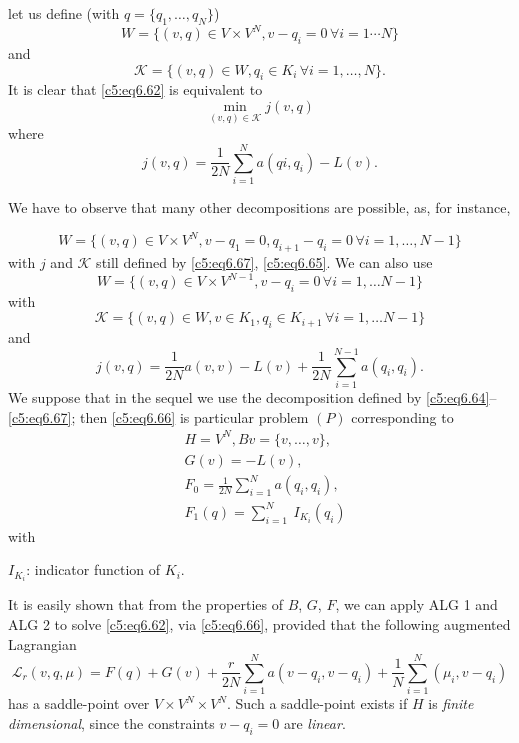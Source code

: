 let us define (with $q = \{ q_1, \ldots, q_N \}$)
\begin{equation}
W = \{ (v, q) \in V \times V^N,  v-q_i = 0\, \forall i = 1\cdots N 
\} \tag{6.64}\label{c5:eq6.64} 
\end{equation}
and 
\begin{equation}
\mathscr{K} = \{ (v, q) \in W,  q_i \in K_i\, \forall i = 1,  
\ldots, N \}. \tag{6.65}\label{c5:eq6.65} 
\end{equation}
It is clear that \eqref{c5:eq6.62} is equivalent to 
\begin{equation}
\min_{(v, q) \in \mathscr{K}} j (v, q) \tag{6.66}\label{c5:eq6.66}
\end{equation}
where 
\begin{equation}
j(v, q) = \frac{1}{2N} \sum^N_{i=1} a (qi, q_i) - L(v). 
\tag{6.67}\label{c5:eq6.67} 
\end{equation}

\begin{remark}\label{c5:rem6.8}%
We have to observe that many other decompositions are possible, as,
for instance,  
\end{remark}
$$
W = \{ (v, q) \in V \times V^N, v-q_1 =0,  q_{i+1}-q_i = 0\, \forall 
i = 1, \ldots, N - 1 \} 
$$
with $j$ and $\mathscr{K}$ still defined by \eqref{c5:eq6.67}, 
\eqref{c5:eq6.65}. We can also use  
$$
W = \{ (v, q) \in V \times V^{N-1},  v-q_i = 0\, \forall i = 1,  
\ldots N-1 \} 
$$
with 
$$
\mathscr{K}= \{ (v, q) \in W,  v \in K_1, q_i \in K_{i + 
1}\, \forall i = 1,  \ldots N-1 \} 
$$
and 
$$
j(v, q) = \frac{1}{2N} a(v, v) - L (v) + \frac{1}{2N} \sum^{N-1}_{i=1} 
a (q_i, q_i).  
$$\pageoriginale  
We suppose that in the sequel we use the decomposition defined by 
\eqref{c5:eq6.64}--\eqref{c5:eq6.67}; then \eqref{c5:eq6.66} is 
particular problem $(P)$ corresponding to   
\begin{align*}
&H = V^N, Bv = \{ v, \ldots, v \}, \tag{6.68}\label{c5:eq6.68}\\
&G (v) = -L(v), \tag{6.69}\label{c5:eq6.69}\\
&F_0 = \frac{1}{2N} \sum^N_{i = 1} a (q_i, q_i), \tag{6.70}\label{c5:eq6.70}\\
&F_1 (q) = \sum^N_{i=1} ~ I_{K_i} (q_i)\tag{6.71}\label{c5:eq6.71}
\end{align*}
with 

$I_{K_i}$: indicator function of $K_i$. 

\noindent
It is easily shown that from the properties of $B$, $G$, $F$, we can  
apply ALG 1  and ALG 2  to solve \eqref{c5:eq6.62},  via 
\eqref{c5:eq6.66},  provided that the following augmented Lagrangian   
\begin{equation}
\mathscr{L}_r (v, q, \mu ) = F (q) + G (v) + \frac{r}{2N} \sum^N_{i=1} 
a(v-q_i,  v-q_i) + \frac{1}{N} \sum^N_{i=1} (\mu_i, 
v-q_i)\tag{6.72}\label{c5:eq6.72}  
\end{equation}
 has a saddle-point over $V \times V^N \times V^N$. Such a saddle-point 
 exists if $H$ is \textit{finite dimensional}, since the constraints $v 
 - q_i = 0$ are \textit{linear}.  

